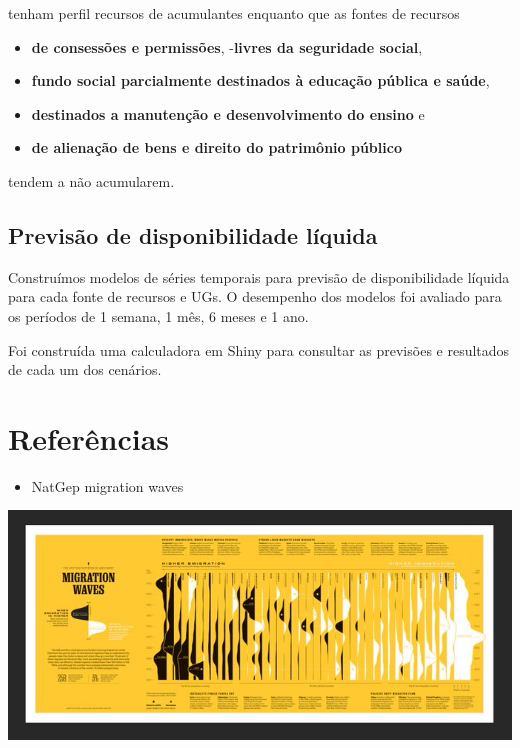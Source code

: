 \documentclass[]{book}
\providecommand{\tightlist}{%
  \setlength{\itemsep}{0pt}\setlength{\parskip}{0pt}}
\begin{document}
tenham perfil recursos de acumulantes enquanto que as fontes de recursos

\begin{itemize}
\tightlist
\item
  \textbf{de consessões e permissões},
  -\textbf{livres da seguridade social},
\item
  \textbf{fundo social parcialmente destinados à educação pública e saúde},
\item
  \textbf{destinados a manutenção e desenvolvimento do ensino} e
\item
  \textbf{de alienação de bens e direito do patrimônio público}
\end{itemize}

tendem a não acumularem.

\hypertarget{previsao-de-disponibilidade-liquida}{%
\section{Previsão de disponibilidade líquida}\label{previsao-de-disponibilidade-liquida}}

Construímos modelos de séries temporais para previsão de disponibilidade líquida para cada fonte de recursos e UGs.
O desempenho dos modelos foi avaliado para os períodos de 1 semana, 1 mês, 6 meses e 1 ano.

Foi construída uma calculadora em Shiny para consultar as previsões e resultados de cada um dos cenários.

\hypertarget{referencias}{%
\chapter*{Referências}\label{referencias}}

\begin{itemize}
\tightlist
\item
  NatGep migration waves
\end{itemize}

\includegraphics{natgeo.jpg}
\end{document}
